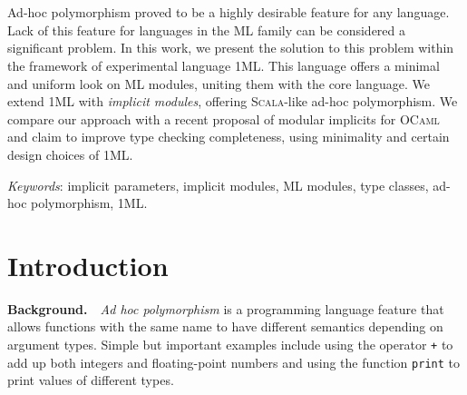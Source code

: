 \documentclass{spbau-diploma}
\begin{document}
\maketitle
\tableofcontents
\section*{}

Ad-hoc polymorphism proved to be a highly desirable feature for any language. Lack of this feature for languages in the \textsc{ML} family can be considered a significant problem. In this work, we present the solution to this problem within the framework of experimental language \textsc{1ML}. This language offers a minimal and uniform look on \textsc{ML} modules, uniting them with the core language. We extend \textsc{1ML} with \textit{implicit modules}, offering \textsc{Scala}-like ad-hoc polymorphism. We compare our approach with a recent proposal of modular implicits for \textsc{OCaml} and claim to improve type checking completeness, using minimality and certain design choices of \textsc{1ML}.

\textit{Keywords}: implicit parameters, implicit modules, \textsc{ML} modules, type classes, ad-hoc polymorphism, \textsc{1ML}.

\section{Introduction}

\textbf{Background.}~~\textit{Ad hoc polymorphism} is a programming language feature that allows functions with the same name to have different semantics depending on argument types. Simple but important examples include using the operator \texttt{+} to add up both integers and floating-point numbers and using the function \texttt{print} to print values of different types.
\end{document}
